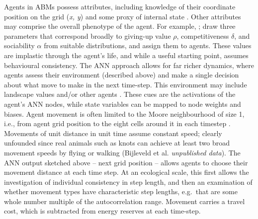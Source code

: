 Agents in ABMs possess attributes, including knowledge of their coordinate position on the grid (\emph{x, y}) and some proxy of internal state \citep[energy reserves; e.g.][]{vangils2010}. Other attributes may comprise the overall phenotype of the agent. For example, \citet{getz2015}; \citet{getz2016} draw three parameters that correspond broadly to giving-up value $\rho$, competitiveness $\delta$, and sociability $\alpha$ from suitable distributions, and assign them to agents. These values are implastic through the agent's life, and while a useful starting point, assumes behavioural consistency. The ANN approach allows for far richer dynamics, where agents assess their environment (described above) and make a single decision about what move to make in the next time-step. This environment may include landscape values and/or other agents \citep{netz2017}. These cues are the activations of the agent's ANN nodes, while state variables can be mapped to node weights and biases. Agent movement is often limited to the Moore neighbourhood of size 1, i.e., from agent grid position to the eight cells around it in each timestep \citep{getz2015, netz2017}. Movements of unit distance in unit time assume constant speed; clearly unfounded since real animals such as knots can achieve at least two broad movement speeds by flying or walking (Bijleveld et al. \emph{unpublished data}). The ANN output sketched above -- next grid position -- allows agents to choose their movement distance at each time step. At an ecological scale, this first allows the investigation of individual consistency in step length, and then an examination of whether movement types have characteristic step lengths, e.g.~that are some whole number multiple of the autocorrelation range. Movement carries a travel cost, which is subtracted from energy reserves at each time-step.

